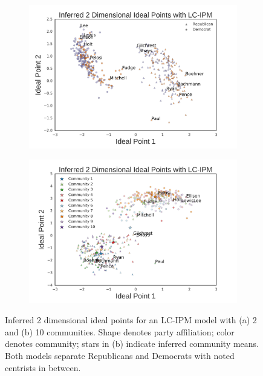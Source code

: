 \documentclass{article}
\begin{document}
\begin{figure}[h]
  \centering
          \begin{subfigure}[b]{0.45\textwidth}
        \includegraphics[width=\textwidth]{ideal_points_congress_2.png}
        \caption{}
    \end{subfigure}
          \begin{subfigure}[b]{0.45\textwidth}
        \includegraphics[width=\textwidth]{ideal_points_congress_10.png}
        \caption{}
    \end{subfigure}

  \caption{Inferred 2 dimensional ideal points for an LC-IPM model with (a) 2 and (b) 10 communities. Shape denotes party affiliation; color denotes community; stars in (b) indicate inferred community means. Both models separate Republicans and Democrats with noted centrists in between.}
      \label{fig:2_comm_lcipm}
\end{figure}
\end{document}
